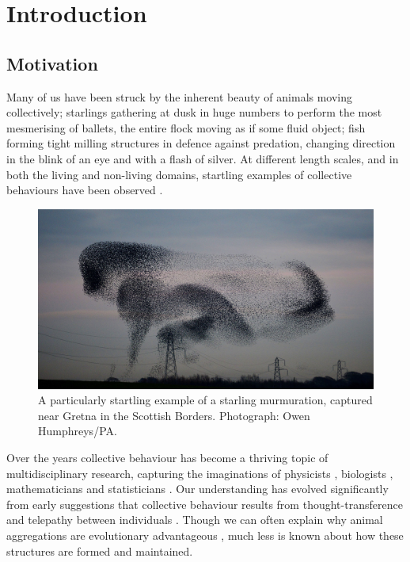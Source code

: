 \chapter{Introduction}
\label{cha:introduction}

\section{Motivation}
\label{sec:motivation}

Many of us have been struck by the inherent beauty of animals moving collectively; starlings gathering at dusk in huge numbers to perform the most mesmerising of ballets, the entire flock moving as if some fluid object; fish forming tight milling structures in defence against predation, changing direction in the blink of an eye and with a flash of silver. At different length scales, and in both the living and non-living domains, startling examples of collective behaviours have been observed \citep{parrish99}.

\begin{figure}[!htbp]
	\includegraphics[width=\textwidth]{fig/murmuration.jpg}
	\caption{A particularly startling example of a starling murmuration, captured near Gretna in the Scottish Borders. Photograph: Owen Humphreys/PA.}
	\label{fig:murmuration}
\end{figure}

\clearpage

Over the years collective behaviour has become a thriving topic of multidisciplinary research, capturing the imaginations of physicists \citep{vicsek95}, biologists \citep{couzin02}, mathematicians \citep{lukeman10} and statisticians \citep{mann11}. Our understanding has evolved significantly from early suggestions that collective behaviour results from thought-transference and telepathy between individuals \citep{selous31}. Though we can often explain why animal aggregations are evolutionary advantageous \citep{giardina08}, much less is known about how these structures are formed and maintained.

